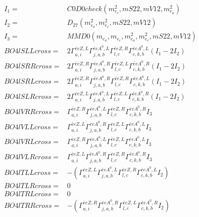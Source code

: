 \documentclass[A4,landscape]{article}
\begin{document}
\begin{align} 
I_1 = & C0D0check(m^2_{e_{{c}}}, mS22, mV12, m^2_{e_{{a}}}) \\ 
I_2 = & D_{27}(m^2_{e_{{a}}}, m^2_{e_{{c}}}, mS22, mV12) \\ 
I_3 = & MMD0(m_{e_{{a}}}, m_{e_{{c}}}, m^2_{e_{{a}}}, m^2_{e_{{c}}}, mS22, mV12) \\ 
  BO4lSLLcross= & 2  \Gamma^{\bar{e}e Z ,L}_{a, i} \Gamma^{\bar{e}e A^0 ,L}_{j, a, b} \Gamma^{\bar{e}e Z ,R}_{l, c} \Gamma^{\bar{e}e A^0 ,L}_{c, k, b} (I_1 - 2 I_2) \\ 
  BO4lSRRcross= & 2  \Gamma^{\bar{e}e Z ,R}_{a, i} \Gamma^{\bar{e}e A^0 ,R}_{j, a, b} \Gamma^{\bar{e}e Z ,L}_{l, c} \Gamma^{\bar{e}e A^0 ,R}_{c, k, b} (I_1 - 2 I_2) \\ 
  BO4lSRLcross= & 2  \Gamma^{\bar{e}e Z ,R}_{a, i} \Gamma^{\bar{e}e A^0 ,R}_{j, a, b} \Gamma^{\bar{e}e Z ,R}_{l, c} \Gamma^{\bar{e}e A^0 ,L}_{c, k, b} (I_1 - 2 I_2) \\ 
  BO4lSLRcross= & 2  \Gamma^{\bar{e}e Z ,L}_{a, i} \Gamma^{\bar{e}e A^0 ,L}_{j, a, b} \Gamma^{\bar{e}e Z ,L}_{l, c} \Gamma^{\bar{e}e A^0 ,R}_{c, k, b} (I_1 - 2 I_2) \\ 
  BO4lVRRcross= &  \Gamma^{\bar{e}e Z ,R}_{a, i} \Gamma^{\bar{e}e A^0 ,L}_{j, a, b} \Gamma^{\bar{e}e Z ,R}_{l, c} \Gamma^{\bar{e}e A^0 ,R}_{c, k, b} I_3 \\ 
  BO4lVLLcross= &  \Gamma^{\bar{e}e Z ,L}_{a, i} \Gamma^{\bar{e}e A^0 ,R}_{j, a, b} \Gamma^{\bar{e}e Z ,L}_{l, c} \Gamma^{\bar{e}e A^0 ,L}_{c, k, b} I_3 \\ 
  BO4lVRLcross= &  \Gamma^{\bar{e}e Z ,R}_{a, i} \Gamma^{\bar{e}e A^0 ,L}_{j, a, b} \Gamma^{\bar{e}e Z ,L}_{l, c} \Gamma^{\bar{e}e A^0 ,L}_{c, k, b} I_3 \\ 
  BO4lVLRcross= &  \Gamma^{\bar{e}e Z ,L}_{a, i} \Gamma^{\bar{e}e A^0 ,R}_{j, a, b} \Gamma^{\bar{e}e Z ,R}_{l, c} \Gamma^{\bar{e}e A^0 ,R}_{c, k, b} I_3 \\ 
  BO4lTLLcross= & -( \Gamma^{\bar{e}e Z ,L}_{a, i} \Gamma^{\bar{e}e A^0 ,L}_{j, a, b} \Gamma^{\bar{e}e Z ,R}_{l, c} \Gamma^{\bar{e}e A^0 ,L}_{c, k, b} I_2) \\ 
  BO4lTLRcross= & 0 \\ 
  BO4lTRLcross= & 0 \\ 
  BO4lTRRcross= & -( \Gamma^{\bar{e}e Z ,R}_{a, i} \Gamma^{\bar{e}e A^0 ,R}_{j, a, b} \Gamma^{\bar{e}e Z ,L}_{l, c} \Gamma^{\bar{e}e A^0 ,R}_{c, k, b} I_2) \\ 
\end{align} 
\end{document}
